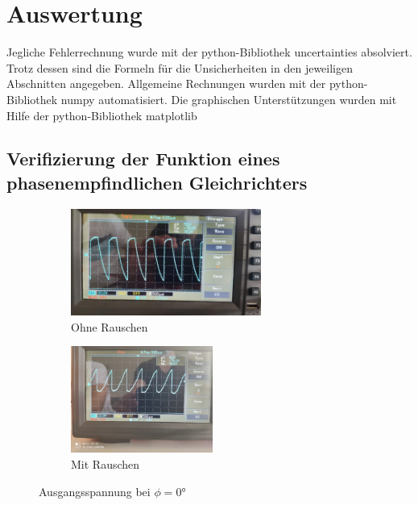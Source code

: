 \section{Auswertung}
\label{sec:Auswertung}Jegliche Fehlerrechnung wurde mit der python-Bibliothek uncertainties \cite{uncertainties} absolviert.
Trotz dessen sind die Formeln für die Unsicherheiten in den jeweiligen Abschnitten angegeben.
Allgemeine Rechnungen wurden mit der python-Bibliothek numpy \cite{numpy} automatisiert.  
Die graphischen Unterstützungen wurden mit Hilfe der python-Bibliothek matplotlib \cite{matplotlib}
\subsection{Verifizierung der Funktion eines phasenempfindlichen Gleichrichters}
\label{sec:phase}
\begin{figure}
    \begin{subfigure}{0.48 \textwidth}
        \centering
        \includegraphics[height = 3.5cm]{data_scripts/pics/0o.jpeg}
        \caption{Ohne Rauschen}
    \end{subfigure}
    \hfill
    \begin{subfigure}{0.48 \textwidth}
            \centering
            \includegraphics[height = 3.5cm]{data_scripts/pics/0m.jpeg}
            \caption{Mit Rauschen}
    \end{subfigure}
    \caption{Ausgangsspannung bei $\phi = \ang{0;;}$}
\end{figure}
